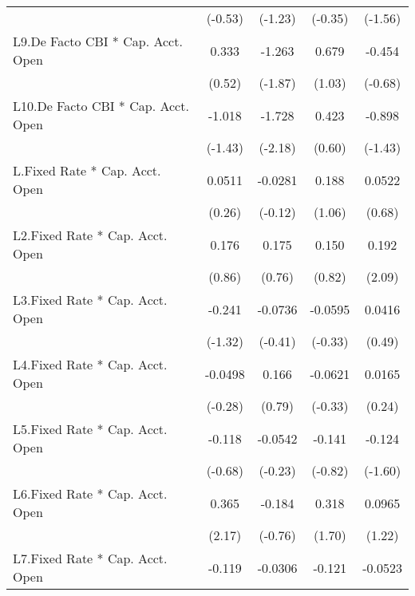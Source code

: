 {\begin{longtable}{l*{4}{c}}
                &  (-0.53)         &  (-1.23)         &  (-0.35)         &  (-1.56)         \\
[1em]
L9.De Facto CBI * Cap. Acct. Open&    0.333         &   -1.263         &    0.679         &   -0.454         \\
                &   (0.52)         &  (-1.87)         &   (1.03)         &  (-0.68)         \\
[1em]
L10.De Facto CBI * Cap. Acct. Open&   -1.018         &   -1.728\sym{*}  &    0.423         &   -0.898         \\
                &  (-1.43)         &  (-2.18)         &   (0.60)         &  (-1.43)         \\
[1em]
L.Fixed Rate * Cap. Acct. Open&   0.0511         &  -0.0281         &    0.188         &   0.0522         \\
                &   (0.26)         &  (-0.12)         &   (1.06)         &   (0.68)         \\
[1em]
L2.Fixed Rate * Cap. Acct. Open&    0.176         &    0.175         &    0.150         &    0.192\sym{*}  \\
                &   (0.86)         &   (0.76)         &   (0.82)         &   (2.09)         \\
[1em]
L3.Fixed Rate * Cap. Acct. Open&   -0.241         &  -0.0736         &  -0.0595         &   0.0416         \\
                &  (-1.32)         &  (-0.41)         &  (-0.33)         &   (0.49)         \\
[1em]
L4.Fixed Rate * Cap. Acct. Open&  -0.0498         &    0.166         &  -0.0621         &   0.0165         \\
                &  (-0.28)         &   (0.79)         &  (-0.33)         &   (0.24)         \\
[1em]
L5.Fixed Rate * Cap. Acct. Open&   -0.118         &  -0.0542         &   -0.141         &   -0.124         \\
                &  (-0.68)         &  (-0.23)         &  (-0.82)         &  (-1.60)         \\
[1em]
L6.Fixed Rate * Cap. Acct. Open&    0.365\sym{*}  &   -0.184         &    0.318         &   0.0965         \\
                &   (2.17)         &  (-0.76)         &   (1.70)         &   (1.22)         \\
[1em]
L7.Fixed Rate * Cap. Acct. Open&   -0.119         &  -0.0306         &   -0.121         &  -0.0523         \\

\end{longtable}}
